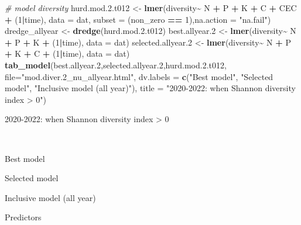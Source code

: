 \documentclass[
]{article}
\newenvironment{Shaded}{\begin{snugshade}}{\end{snugshade}}
\newcommand{\AttributeTok}[1]{\textcolor[rgb]{0.13,0.29,0.53}{#1}}
\newcommand{\CommentTok}[1]{\textcolor[rgb]{0.56,0.35,0.01}{\textit{#1}}}
\newcommand{\DecValTok}[1]{\textcolor[rgb]{0.00,0.00,0.81}{#1}}
\newcommand{\FloatTok}[1]{\textcolor[rgb]{0.00,0.00,0.81}{#1}}
\newcommand{\FunctionTok}[1]{\textcolor[rgb]{0.13,0.29,0.53}{\textbf{#1}}}
\newcommand{\NormalTok}[1]{#1}
\newcommand{\OtherTok}[1]{\textcolor[rgb]{0.56,0.35,0.01}{#1}}
\newcommand{\SpecialCharTok}[1]{\textcolor[rgb]{0.81,0.36,0.00}{\textbf{#1}}}
\newcommand{\StringTok}[1]{\textcolor[rgb]{0.31,0.60,0.02}{#1}}
\begin{document}
\begin{Shaded}
\begin{Highlighting}[]
\CommentTok{\# model diversity}
\NormalTok{hurd.mod.}\FloatTok{2.}\NormalTok{t012 }\OtherTok{\textless{}{-}} \FunctionTok{lmer}\NormalTok{(diversity}\SpecialCharTok{\textasciitilde{}}\NormalTok{ N }\SpecialCharTok{+}\NormalTok{ P }\SpecialCharTok{+}\NormalTok{ K }\SpecialCharTok{+}\NormalTok{ C }\SpecialCharTok{+}\NormalTok{ CEC }\SpecialCharTok{+}\NormalTok{ (}\DecValTok{1}\SpecialCharTok{|}\NormalTok{time), }\AttributeTok{data =}\NormalTok{ dat, }\AttributeTok{subset =}\NormalTok{ (non\_zero }\SpecialCharTok{==} \DecValTok{1}\NormalTok{),}\AttributeTok{na.action =} \StringTok{"na.fail"}\NormalTok{)}
\NormalTok{dredge\_allyear }\OtherTok{\textless{}{-}} \FunctionTok{dredge}\NormalTok{(hurd.mod.}\FloatTok{2.}\NormalTok{t012)}
\NormalTok{best.allyear}\FloatTok{.2} \OtherTok{\textless{}{-}} \FunctionTok{lmer}\NormalTok{(diversity}\SpecialCharTok{\textasciitilde{}}\NormalTok{ N }\SpecialCharTok{+}\NormalTok{ P }\SpecialCharTok{+}\NormalTok{ K }\SpecialCharTok{+}\NormalTok{ (}\DecValTok{1}\SpecialCharTok{|}\NormalTok{time), }\AttributeTok{data =}\NormalTok{ dat)}
\NormalTok{selected.allyear}\FloatTok{.2} \OtherTok{\textless{}{-}} \FunctionTok{lmer}\NormalTok{(diversity}\SpecialCharTok{\textasciitilde{}}\NormalTok{ N }\SpecialCharTok{+}\NormalTok{ P }\SpecialCharTok{+}\NormalTok{ K }\SpecialCharTok{+}\NormalTok{ C }\SpecialCharTok{+}\NormalTok{ (}\DecValTok{1}\SpecialCharTok{|}\NormalTok{time), }\AttributeTok{data =}\NormalTok{ dat)}
\FunctionTok{tab\_model}\NormalTok{(best.allyear}\FloatTok{.2}\NormalTok{,selected.allyear}\FloatTok{.2}\NormalTok{,hurd.mod.}\FloatTok{2.}\NormalTok{t012, }\AttributeTok{file=}\StringTok{"mod.diver.2\_nu\_allyear.html"}\NormalTok{, }\AttributeTok{dv.labels =} \FunctionTok{c}\NormalTok{(}\StringTok{"Best model"}\NormalTok{, }\StringTok{"Selected model"}\NormalTok{, }\StringTok{"Inclusive model (all year)"}\NormalTok{), }\AttributeTok{title =} \StringTok{"2020{-}2022: when Shannon diversity index \textgreater{} 0"}\NormalTok{)}
\end{Highlighting}
\end{Shaded}

2020-2022: when Shannon diversity index \textgreater{} 0

~

Best model

Selected model

Inclusive model (all year)

Predictors
\end{document}
